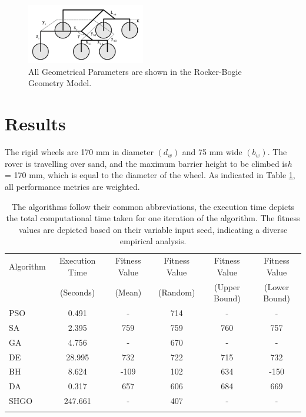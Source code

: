 \documentclass[default,iicol]{sn-jnl}
\theoremstyle{thmstyleone}
\theoremstyle{thmstyletwo}
\theoremstyle{thmstylethree}
\begin{document}
\begin{figure}[ht]
\centering
\includegraphics[width=0.46\textwidth]{Fig11.png}
\caption{All Geometrical Parameters are shown in the Rocker-Bogie Geometry Model.}\label{fig11}
\end{figure}


\section{Results}\label{sec5}

The rigid wheels are 170 mm in diameter $(d_w)$ and 75 mm wide $(b_w)$. The rover is travelling over sand, and the maximum barrier height to be climbed is$h$ = 170 mm, which is equal to the diameter of the wheel. As indicated in Table \ref{tab4}, all performance metrics are weighted.

\begin{table}
\sidewaystablefn
\begin{center}
\begin{minipage}{\textheight}
\caption{The algorithms follow their common abbreviations, the execution time depicts the total computational time taken for one iteration of the algorithm. The fitness values are depicted based on their variable input seed, indicating a diverse empirical analysis.}\label{tab4}
\begin{tabular*}{\textheight}{@{\extracolsep{\fill}}lccccc@{\extracolsep{\fill}}}
\toprule
Algorithm & Execution Time   & Fitness Value
 & Fitness Value & Fitness Value
 & Fitness Value
\tabularnewline
& (Seconds)  & 
(Mean) & (Random) & 
(Upper Bound) & 
(Lower Bound)  \\
\midrule
PSO   & 0.491  &  -  & 714 & - & - \\
SA   & 2.395  & 759  & 759 & 760 & 757 \\
GA   & 4.756  &  -   & 670 & - & - \\
DE   & 28.995  &  732 & 722 & 715 & 732 \\
BH   & 8.624  & -109  & 102 & 634 & -150 \\
DA   & 0.317  &  657  & 606 & 684 & 669 \\
SHGO   & 247.661  &  -  & 407 & - & - \\
\botrule
\end{tabular*}
\end{minipage}
\end{center}
\end{table}
\end{document}
